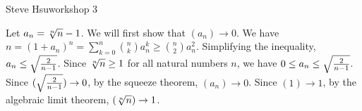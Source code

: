 \centerline{Steve Hsu\hfill workshop 3}
Let $a_n = \root n \of n - 1$.
We will first show that $(a_n) \to 0$.
We have $n = (1 + a_n)^n = \sum _{k = 0} ^n {n \choose k} a_n^k \ge
{n \choose 2} a_n^2$.
Simplifying the inequality, $a_n \le \sqrt {2 \over n - 1}$.
Since $\root n \of n \ge 1$ for all natural numbers $n$,
we have $0 \le a_n \le \sqrt {2 \over n - 1}$.
Since $(\sqrt {2 \over n - 1}) \to 0$, by the squeeze theorem,
$(a_n) \to 0$.
Since $(1) \to 1$, by the algebraic limit theorem,
$(\root n \of n) \to 1$.
\bye
